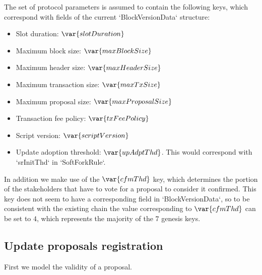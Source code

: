 The set of protocol parameters is assumed to contain the following keys, which
correspond with fields of the current `BlockVersionData` structure:
\begin{itemize}
\item Slot duration: $\var{slotDuration}$
\item Maximum block size: $\var{maxBlockSize}$
\item Maximum header size: $\var{maxHeaderSize}$
\item Maximum transaction size: $\var{maxTxSize}$
\item Maximum proposal size: $\var{maxProposalSize}$
\item Transaction fee policy: $\var{txFeePolicy}$
\item Script version: $\var{scriptVersion}$
\item Update adoption threshold: $\var{upAdptThd}$. This would correspond with
  `srInitThd` in `SoftForkRule`.
\end{itemize}
In addition we make use of the $\var{cfmThd}$ key, which determines the portion
of the stakeholders that have to vote for a proposal to consider it confirmed.
This key does not seem to have a corresponding field in `BlockVersionData`, so
to be consistent with the existing chain the value corresponding to
$\var{cfmThd}$ can be set to $4$, which represents the majority of the $7$
genesis keys.

\subsection{Update proposals registration}
\label{sec:update-proposals-registration}

First we model the validity of a proposal.

